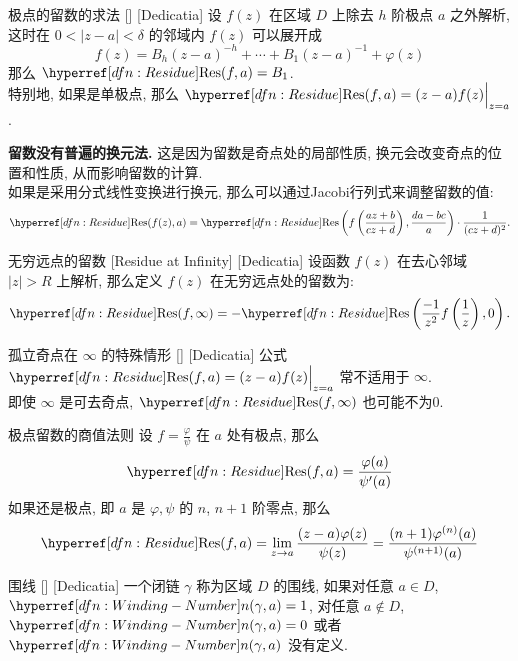         \begin{crl}
            {极点的留数的求法}
            []
            [Dedicatia]
            设 \(f(z)\) 在区域 \(D\) 上除去 \(h\) 阶极点 \(a\) 之外解析, 这时在 \(0<|z-a|<\delta\) 的邻域内 \(f(z)\) 可以展开成
            \[f(z)=B_h(z-a)^{-h}+\cdots+B_1(z-a)^{-1}+\varphi(z)\]
            那么 \(\Res(f,a)=B_1\).\\
            特别地, 如果是单极点, 那么 \(\Res(f,a)=(z-a)f(z)\Big|_{z=a}\).
        \end{crl}
        
        \begin{rmk}
            [Dedicatia]
            \textbf{留数没有普遍的换元法.} 这是因为留数是奇点处的局部性质, 换元会改变奇点的位置和性质, 从而影响留数的计算.\\
            如果是采用分式线性变换进行换元, 那么可以通过Jacobi行列式来调整留数的值:
            \[\Res(f(z),a)=\Res\left(f\left(\frac{az+b}{cz+d}\right),\frac{da-bc}{a}\right)\cdot\frac{1}{(cz+d)^2}.\]
        \end{rmk}

        \begin{dfn}
            {无穷远点的留数}
            [Residue at Infinity]
            [Dedicatia]
            设函数 \(f(z)\) 在去心邻域 \(|z|>R\) 上解析, 那么定义 \(f(z)\) 在无穷远点处的留数为:
            \[\Res(f,\infty)=-\Res\left(\frac{-1}{z^2}f\left(\frac{1}{z}\right),0\right).\]
        \end{dfn}

        \begin{cxmp}
            {孤立奇点在 \(\infty\) 的特殊情形}
            []
            [Dedicatia]
            公式 \(\Res(f,a)=(z-a)f(z)\Big|_{z=a}\) 常不适用于 \(\infty\).\\
            即使 \(\infty\) 是可去奇点, \(\Res(f,\infty)\) 也可能不为0.
        \end{cxmp}

        \begin{crl}
            {极点留数的商值法则}
            设 \(f=\frac{\varphi}{\psi}\) 在 \(a\) 处有极点, 那么
            \[\Res(f,a)=\frac{\varphi(a)}{\psi'(a)}\]
            如果还是极点, 即 \(a\) 是 \(\varphi, \psi\) 的 \(n\),  \(n+1\) 阶零点, 那么
            \[\Res(f,a)=\lim_{z\to a}\frac{(z-a)\varphi(z)}{\psi(z)}=\frac{(n+1)\varphi^{(n)}(a)}{\psi^{(n+1)}(a)}\]
        \end{crl}

        \begin{dfn}
            {围线}
            []
            [Dedicatia]
            一个闭链 \(\gamma\) 称为区域 \(D\) 的围线, 如果对任意 \(a\in D\),  \(\Windn(\gamma,a)=1\), 对任意 \(a\notin D\),  \(\Windn(\gamma,a)=0\) 或者 \(\Windn(\gamma,a)\) 没有定义. 
        \end{dfn}

